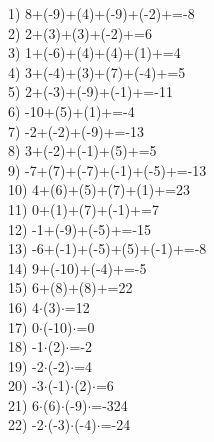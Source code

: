 \documentclass[a4paper,10pt]{article}
\begin{document}
1)   8+(-9)+(4)+(-9)+(-2)+=-8
\vspace{0.5cm}\\2)   2+(3)+(3)+(-2)+=6
\vspace{0.5cm}\\3)   1+(-6)+(4)+(4)+(1)+=4
\vspace{0.5cm}\\4)   3+(-4)+(3)+(7)+(-4)+=5
\vspace{0.5cm}\\5)   2+(-3)+(-9)+(-1)+=-11
\vspace{0.5cm}\\6)   -10+(5)+(1)+=-4
\vspace{0.5cm}\\7)   -2+(-2)+(-9)+=-13
\vspace{0.5cm}\\8)   3+(-2)+(-1)+(5)+=5
\vspace{0.5cm}\\9)   -7+(7)+(-7)+(-1)+(-5)+=-13
\vspace{0.5cm}\\10)   4+(6)+(5)+(7)+(1)+=23
\vspace{0.5cm}\\11)   0+(1)+(7)+(-1)+=7
\vspace{0.5cm}\\12)   -1+(-9)+(-5)+=-15
\vspace{0.5cm}\\13)   -6+(-1)+(-5)+(5)+(-1)+=-8
\vspace{0.5cm}\\14)   9+(-10)+(-4)+=-5
\vspace{0.5cm}\\15)   6+(8)+(8)+=22
\vspace{0.5cm}\\16)   4$\cdot$(3)$\cdot$=12
\vspace{0.5cm}\\17)   0$\cdot$(-10)$\cdot$=0
\vspace{0.5cm}\\18)   -1$\cdot$(2)$\cdot$=-2
\vspace{0.5cm}\\19)   -2$\cdot$(-2)$\cdot$=4
\vspace{0.5cm}\\20)   -3$\cdot$(-1)$\cdot$(2)$\cdot$=6
\vspace{0.5cm}\\21)   6$\cdot$(6)$\cdot$(-9)$\cdot$=-324
\vspace{0.5cm}\\22)   -2$\cdot$(-3)$\cdot$(-4)$\cdot$=-24
\end{document}
